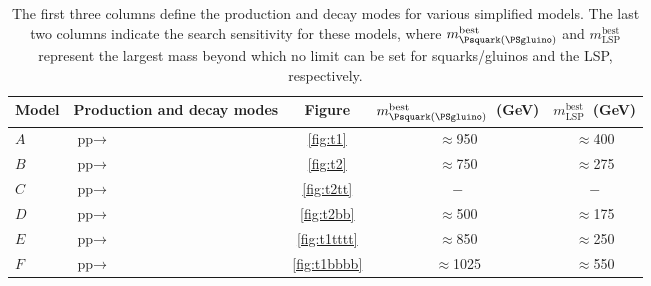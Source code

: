 \begin{table}
  \caption{The first three columns define the production and decay
    modes for various simplified models. The last two columns
    indicate the search sensitivity for these models, where
    $m_{\Psquark(\PSgluino)}^{\textrm{best}}$ and
    $m_{\textrm{LSP}}^{\textrm{best}}$ represent the largest mass
    beyond which no limit can be set for squarks/gluinos and the LSP,
    respectively\cite{Chatrchyan:2012wa}.
  }  
  \label{tab:sms_summary}
  \centering
  \begin{tabular}{ llccc }
    \hline
    Model & Production and decay modes & Figure & 
    $m_{\Psquark(\PSgluino)}^{\textrm{best}}$~(GeV) & $m_{
    \textrm{LSP}}^{\textrm{best}}$~(GeV) \\ [0.5ex]
    \hline
    $A$ & $\textrm{pp}\rightarrow$ \HepProcess{\PSgluino\PSgluino\to\Pquark\APquark\PSneutralino\Pquark\APquark\PSneutralino}
    & \ref{fig:t1}  & $\approx$950 & $\approx$400 \\
    $B$ & $\textrm{pp}\rightarrow$\HepProcess{\Psquark\Psquark\to\Pquark\PSneutralino\APquark\PSneutralino}
    & \ref{fig:t2}  & $\approx$750 & $\approx$275 \\
    $C$ & $\textrm{pp}\rightarrow$\HepProcess{\PStop\PStop\to\Ptop\PSneutralino\APtop\PSneutralino} & \ref{fig:t2tt}%
    & $-$ & $-$ \\ %
    $D$ &$\textrm{pp}\rightarrow$\HepProcess{\PSbottom\PSbottom\to\Pbottom\PSneutralino\APbottom\PSneutralino}
    & \ref{fig:t2bb} & $\approx$500 & $\approx$175 \\
    $E$ & $\textrm{pp}\rightarrow$\HepProcess{\PSgluino\PSgluino\to\Ptop\APtop\PSneutralino\Ptop\APtop\PSneutralino} & \ref{fig:t1tttt}  & $\approx$850 & $\approx$250 \\
    $F$ &
    $\textrm{pp}\rightarrow$\HepProcess{\PSgluino\PSgluino\to\Pbottom\APbottom\PSneutralino\Pbottom\APbottom\PSneutralino}
    & \ref{fig:t1bbbb} & $\approx$1025 & $\approx$550 \\
    \hline
  \end{tabular}
\end{table}


